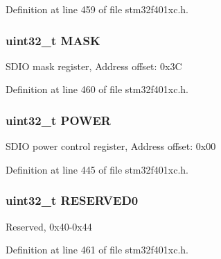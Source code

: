 Definition at line 459 of file stm32f401xc.\+h.

\subsubsection[{\texorpdfstring{M\+A\+SK}{MASK}}]{ uint32\+\_\+t M\+A\+SK}\hypertarget{struct_s_d_i_o___type_def_a5c955643593b4aedbe9f84f054d26522}{}\label{struct_s_d_i_o___type_def_a5c955643593b4aedbe9f84f054d26522}
S\+D\+IO mask register, Address offset\+: 0x3C 

Definition at line 460 of file stm32f401xc.\+h.

\subsubsection[{\texorpdfstring{P\+O\+W\+ER}{POWER}}]{ uint32\+\_\+t P\+O\+W\+ER}\hypertarget{struct_s_d_i_o___type_def_a65bff76f3af24c37708a1006d54720c7}{}\label{struct_s_d_i_o___type_def_a65bff76f3af24c37708a1006d54720c7}
S\+D\+IO power control register, Address offset\+: 0x00 

Definition at line 445 of file stm32f401xc.\+h.

\subsubsection[{\texorpdfstring{R\+E\+S\+E\+R\+V\+E\+D0}{RESERVED0}}]{\setlength{\rightskip}{0pt plus 5cm}uint32\+\_\+t R\+E\+S\+E\+R\+V\+E\+D0}\hypertarget{struct_s_d_i_o___type_def_af2c92c7cb13569aaff6b4f5a25de5056}{}\label{struct_s_d_i_o___type_def_af2c92c7cb13569aaff6b4f5a25de5056}
Reserved, 0x40-\/0x44 

Definition at line 461 of file stm32f401xc.\+h.

